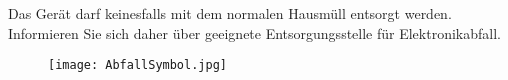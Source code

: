 Das Gerät darf keinesfalls mit dem normalen Hausmüll entsorgt werden. Informieren Sie sich daher über geeignete Entsorgungsstelle für Elektronikabfall.
\\[20mm]
\begin{figure}[h]
	\centering
	\texttt{[image: AbfallSymbol.jpg]}
\end{figure}